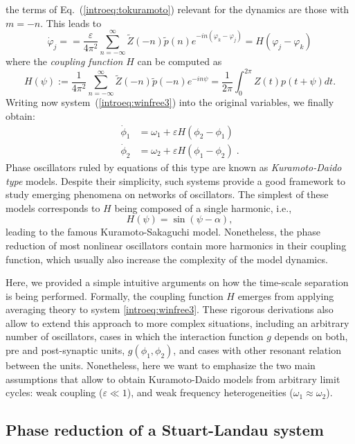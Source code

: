 the terms of Eq.~(\ref{introeq:tokuramoto}) relevant for the dynamics are those with
$m=-n$.
This leads to
\begin{equation}
    \dot \varphi_j=   
         =\frac{\varepsilon}{4\pi^2}\sum_{n=-\infty}^\infty\tilde Z(-n)\tilde p(n)e^{-in(\varphi_k-\varphi_j)}=H(\varphi_j-\varphi_k) 
\end{equation}
where the \emph{coupling function} $H$ can be computed as
\begin{equation}
H(\psi):=\frac{1}{4\pi^2}\sum_{n=-\infty}^\infty \tilde Z(-n)\tilde p(-n)e^{-in \psi}
=\frac{1}{2\pi}\int_0^{2\pi} Z(t)p(t+\psi) dt.
\end{equation}
Writing now system~(\ref{introeq:winfree3}) into the original variables, we finally obtain:
\begin{align}\label{introeq:phasemodel}
\dot \phi_1&=\omega_1+\varepsilon H(\phi_2 -\phi_1)\\
\dot \phi_2&=\omega_2+\varepsilon H(\phi_1 -\phi_2)\;.
\end{align}
Phase oscillators ruled by equations of this type are known as \emph{Kuramoto-Daido type} models.
Despite their simplicity, such systems provide a good framework
to study emerging phenomena on networks of oscillators.
The simplest of these models corresponds to $H$ being composed of a single harmonic, i.e.,
$$H(\psi) = \sin(\psi-\alpha),$$
leading to the famous Kuramoto-Sakaguchi model. 
Nonetheless, the phase reduction of most nonlinear oscillators contain more harmonics in their 
coupling function, which usually also increase the complexity of the model dynamics.

Here, we provided a simple intuitive arguments on how the time-scale separation is being performed.
Formally, the coupling function $H$ emerges from applying averaging theory to system \eqref{introeq:winfree3}.
These rigorous derivations also allow to extend this approach to more complex situations, including
an arbitrary number of oscillators, 
cases in which the interaction function $g$ depends on both, pre and post-synaptic units, $g(\phi_1,\phi_2)$,
and cases with other resonant relation between the units. 
Nonetheless, here we want to emphasize the two main assumptions that allow to obtain Kuramoto-Daido models
from arbitrary limit cycles: weak coupling ($\varepsilon\ll 1$), and weak frequency heterogeneities ($\omega_1\approx \omega_2$). 

\subsection{Phase reduction of a Stuart-Landau system}


